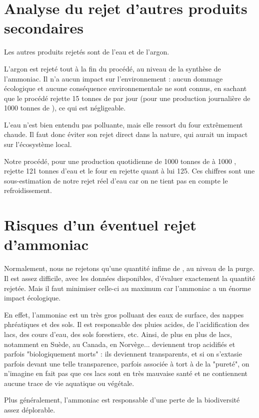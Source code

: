 \documentclass[a4paper, oneside]{scrartcl}
\begin{document}
\section{Analyse du rejet d'autres produits secondaires}
Les autres produits rejetés sont de l'eau et de l'argon.
 

L'argon est rejeté tout à la fin du procédé, au niveau de la synthèse de l'ammoniac. Il n'a aucun impact sur l'environnement : aucun dommage écologique et aucune conséquence environnementale ne sont connus, en sachant que le procédé rejette 15 tonnes de  par jour (pour une production journalière de 1000 tonnes de ), ce qui est négligeable.
 

L'eau n'est bien entendu pas polluante, mais elle ressort du four extrêmement chaude. Il faut donc éviter son rejet direct dans la nature, qui aurait un impact sur l'écosystème local.

Notre procédé, pour une production quotidienne de 1000 tonnes de  à 1000 \kelvin, rejette 121 tonnes d'eau et le four en rejette quant à lui 125. Ces chiffres sont une sous-estimation de notre rejet réel d'eau car on ne tient pas en compte le refroidissement.

\section{Risques d'un éventuel rejet d'ammoniac \cite{ammo1} \cite{ammo2} \cite{ammo3}}
Normalement, nous ne rejetons qu'une quantité infime de , au niveau de la purge. Il est assez difficile, avec les données disponibles, d'évaluer exactement la quantité rejetée. Mais il faut minimiser celle-ci au maximum car l'ammoniac a un énorme impact écologique.
 

En effet, l'ammoniac est un très gros polluant des eaux de surface, des nappes phréatiques et des sols. Il est responsable des pluies acides, de l'acidification des lacs, des cours d'eau, des sols forestiers, etc. Ainsi, de plus en plus de lacs, notamment en Suède, au Canada, en Norvège... deviennent trop acidifiés et parfois "biologiquement morts" : ils deviennent transparents, et si on s'extasie parfois devant une telle transparence, parfois associée à tort à de la "pureté", on n'imagine en fait pas que ces lacs sont en très mauvaise santé et ne contiennent aucune trace de vie aquatique ou végétale.
 

Plus généralement, l'ammoniac est responsable d'une perte de la biodiversité assez déplorable.
\end{document}

